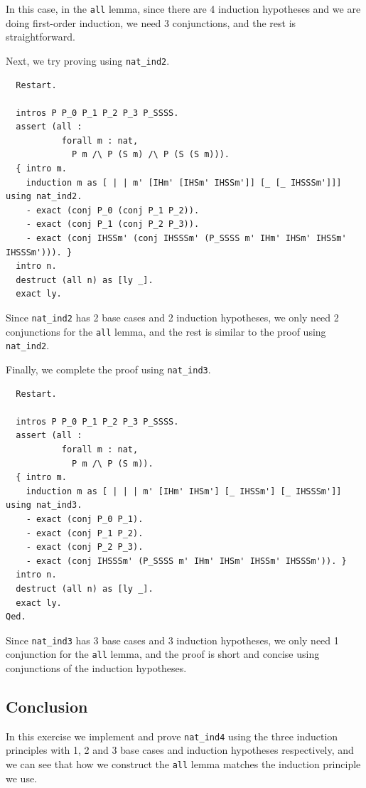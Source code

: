 \documentclass{article}
\begin{document}
In this case, in the \texttt{all} lemma, since there are 4 induction hypotheses and we are doing first-order induction, we need 3 conjunctions, and the rest is straightforward.

Next, we try proving using \texttt{nat\_ind2}.

\begin{lstlisting}
  Restart.

  intros P P_0 P_1 P_2 P_3 P_SSSS.
  assert (all :
           forall m : nat,
             P m /\ P (S m) /\ P (S (S m))).
  { intro m.
    induction m as [ | | m' [IHm' [IHSm' IHSSm']] [_ [_ IHSSSm']]] using nat_ind2.
    - exact (conj P_0 (conj P_1 P_2)).
    - exact (conj P_1 (conj P_2 P_3)).
    - exact (conj IHSSm' (conj IHSSSm' (P_SSSS m' IHm' IHSm' IHSSm' IHSSSm'))). }
  intro n.
  destruct (all n) as [ly _].
  exact ly.
\end{lstlisting}

Since \texttt{nat\_ind2} has 2 base cases and 2 induction hypotheses, we only need 2 conjunctions for the \texttt{all} lemma, and the rest is similar to the proof using \texttt{nat\_ind2}.

Finally, we complete the proof using \texttt{nat\_ind3}.

\begin{lstlisting}
  Restart.

  intros P P_0 P_1 P_2 P_3 P_SSSS.
  assert (all :
           forall m : nat,
             P m /\ P (S m)).
  { intro m.
    induction m as [ | | | m' [IHm' IHSm'] [_ IHSSm'] [_ IHSSSm']] using nat_ind3.
    - exact (conj P_0 P_1).
    - exact (conj P_1 P_2).
    - exact (conj P_2 P_3).
    - exact (conj IHSSSm' (P_SSSS m' IHm' IHSm' IHSSm' IHSSSm')). }
  intro n.
  destruct (all n) as [ly _].
  exact ly.
Qed.
\end{lstlisting}

Since \texttt{nat\_ind3} has 3 base cases and 3 induction hypotheses, we only need 1 conjunction for the \texttt{all} lemma, and the proof is short and concise using conjunctions of the induction hypotheses. 

\subsection{Conclusion}
In this exercise we implement and prove \texttt{nat\_ind4} using the three induction principles with 1, 2 and 3 base cases and induction hypotheses respectively, and we can see that how we construct the \texttt{all} lemma matches the induction principle we use.
\end{document}
